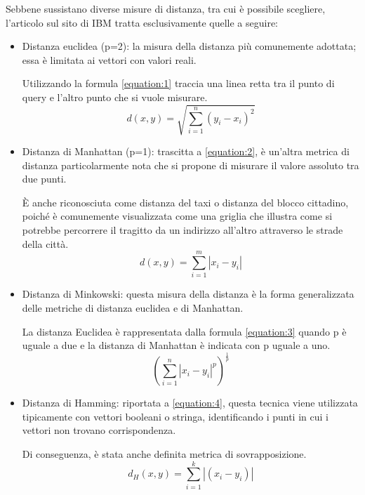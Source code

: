 Sebbene sussistano diverse misure di distanza, tra cui è possibile scegliere, l’articolo sul sito di IBM tratta esclusivamente quelle a seguire:
\begin{itemize}
    \item Distanza euclidea (p=2): la misura della distanza più comunemente adottata; essa è limitata ai vettori con valori reali. 
    
    Utilizzando la formula \ref{equation:1} traccia una linea retta tra il punto di query e l'altro punto che si vuole misurare.
    \begin{equation}
        d(x, y) = \sqrt{\sum_{i=1}^{n} (y_i - x_i)^2}
        \label{equation:1}
    \end{equation}

    \item Distanza di Manhattan (p=1): trascitta a \ref{equation:2}, è un'altra metrica di distanza particolarmente nota che si propone di misurare il valore assoluto tra due punti. 
    
    È anche riconosciuta come distanza del taxi o distanza del blocco cittadino, poiché è comunemente visualizzata come una griglia che illustra come si potrebbe percorrere il tragitto da un indirizzo all'altro attraverso le strade della città.
    \begin{equation}
        d(x, y) = \sum_{i=1}^{m} |x_i - y_i|
        \label{equation:2}
    \end{equation}
    
    \item Distanza di Minkowski: questa misura della distanza è la forma generalizzata delle metriche di distanza euclidea e di Manhattan.
    
    La distanza Euclidea è rappresentata dalla formula \ref{equation:3} quando p è uguale a due e la distanza di Manhattan è indicata con p uguale a uno.
    \begin{equation}
        \left(\sum_{i=1}^{n} |x_i - y_i|^p\right)^{\frac{1}{p}}
        \label{equation:3}
    \end{equation}

    \item Distanza di Hamming: riportata a \ref{equation:4}, questa tecnica viene utilizzata tipicamente con vettori booleani o stringa, identificando i punti in cui i vettori non trovano corrispondenza. 
    
    Di conseguenza, è stata anche definita metrica di sovrapposizione.
    \begin{equation}
        d_H(x, y) = \sum_{i=1}^{k} |(x_i - y_i)|
        \label{equation:4}
    \end{equation}
\end{itemize}


